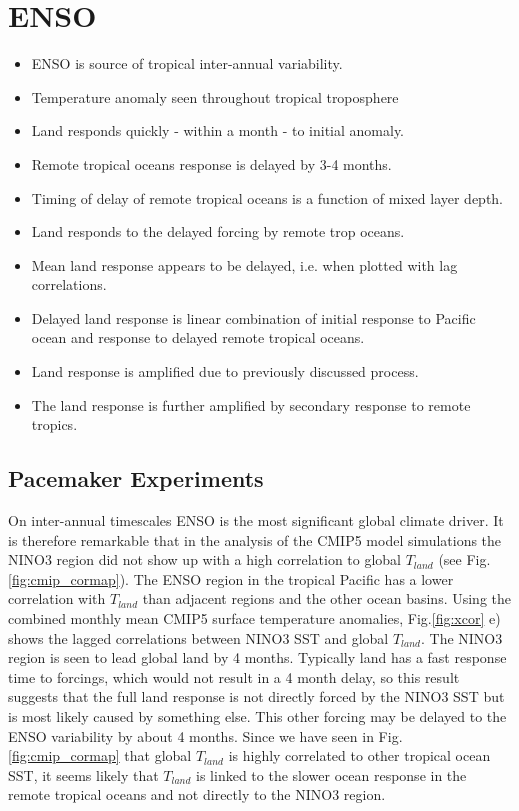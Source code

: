 \section{ENSO}
\begin{itemize}
	\item ENSO is source of tropical inter-annual variability.
	\item Temperature anomaly seen throughout tropical troposphere
	\item Land responds quickly - within a month - to initial anomaly.
	\item Remote tropical oceans response is delayed by 3-4 months.
	\item Timing of delay of remote tropical oceans is a function of mixed layer 
		depth.
	\item Land responds to the delayed forcing by remote trop oceans.
	\item Mean land response appears to be delayed, i.e. when plotted with lag 
		correlations.
	\item Delayed land response is linear combination of initial response to 
		Pacific ocean and response to delayed remote tropical oceans.
	\item Land response is amplified due to previously discussed process.
	\item The land response is further amplified by secondary response to remote 
		tropics.
\end{itemize}

\subsection{Pacemaker Experiments}


On inter-annual timescales ENSO is the most significant global climate driver. 
It is therefore remarkable that in the analysis of the CMIP5 model simulations 
the NINO3 region did not show up with a high correlation to global $T_{land}$ 
(see Fig.\ref{fig:cmip_cormap}). The ENSO region in the tropical Pacific has a 
lower correlation with $T_{land}$ than adjacent regions and the other ocean 
basins. Using the combined monthly mean CMIP5 surface temperature anomalies, 
Fig.\ref{fig:xcor} e) shows the lagged correlations between NINO3 SST and global 
$T_{land}$. The NINO3 region is seen to lead global land by 4 months.  Typically 
land has a fast response time to forcings, which would not result in a 
4 month delay, so this result suggests that the full land response is not 
directly forced by the NINO3 SST but is most likely caused by something else. 
This other forcing may be delayed to the ENSO variability by about 4 months. 
Since we have seen in Fig.\ref{fig:cmip_cormap} that global $T_{land}$ is highly 
correlated to other tropical ocean SST, it seems likely that $T_{land}$ is 
linked to the slower ocean response in the remote tropical oceans and not 
directly to the NINO3 region.

